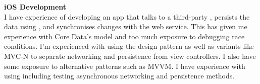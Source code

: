 \textbf{iOS Development}\\
I have experience of developing an app that talks to a third-party
, persists the data using , and
synchronises changes with the web service. This has given me experience with
Core Data's  model and too much exposure to debugging race
conditions. I'm experienced with using the  design pattern as well as
variants like MVC-N to separate networking and persistence from view
controllers. I also have some exposure to alternative patterns such as MVVM. I
have experience with  using  including testing
asynchronous networking and persistence methods.


